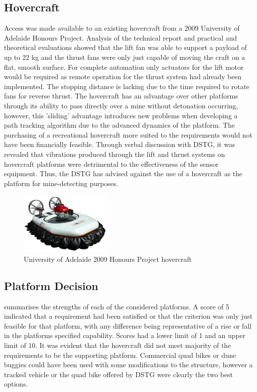\documentclass[main.tex]{subfiles}
\begin{document}
\subsection{Hovercraft}
Access was made available to an existing hovercraft from a 2009 University of Adelaide Honours Project. Analysis of the technical report \parencite{hovercraft2009} and practical and theoretical evaluations showed that the lift fan was able to support a payload of up to 22 kg and the thrust fans were only just capable of moving the craft on a flat, smooth surface. For complete automation only actuators for the lift motor would be required as remote operation for the thrust system had already been implemented. The stopping distance is lacking due to the time required to rotate fans for reverse thrust. The hovercraft has an advantage over other platforms through its ability to pass directly over a mine without detonation occurring, however, this 'sliding' advantage introduces new problems when developing a path tracking algorithm due to the advanced dynamics of the platform. The purchasing of a recreational hovercraft more suited to the requirements would not have been financially feasible. Through verbal discussion with DSTG, it was revealed that vibrations produced through the lift and thrust systems on hovercraft platforms were detrimental to the effectiveness of the sensor equipment. Thus, the DSTG has advised against the use of a hovercraft as the platform for mine-detecting purposes.
\begin{figure}[ht]
\includegraphics[width=0.4\textwidth]{4-ConceptDesign/HovercraftPic.png}
\centering
\caption[University of Adelaide 2009 Honours Project hovercraft]{University of Adelaide 2009 Honours Project hovercraft \parencite{hovercraft2009}} 
\end{figure}

\subsection{Platform Decision}
 summarises the strengths of each of the considered platforms. A score of 5 indicated that a requirement had been satisfied or that the criterion was only just feasible for that platform, with any difference being representative of a rise or fall in the platforms specified capability. Scores had a lower limit of 1 and an upper limit of 10. It was evident that the hovercraft did not meet majority of the requirements to be the supporting platform. Commercial quad bikes or dune buggies could have been used with some modifications to the structure, however a tracked vehicle or the quad bike offered by DSTG were clearly the two best options.
\end{document}
